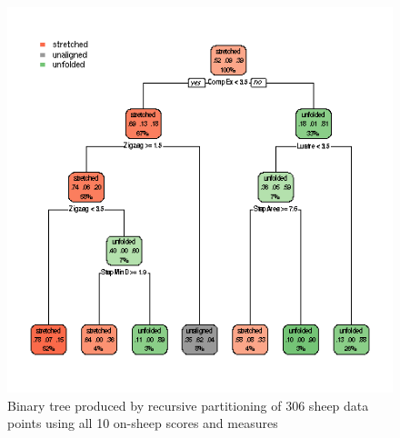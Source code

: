 %

\begin{figure}[!h]
  \centering
  \includegraphics[width=1.1\textwidth]{figrpart1.png}
  \caption{Binary tree produced by recursive partitioning of 306 sheep data points using all 10 on-sheep scores and measures}
  \label{fig:rpart1}
\end{figure}

%

